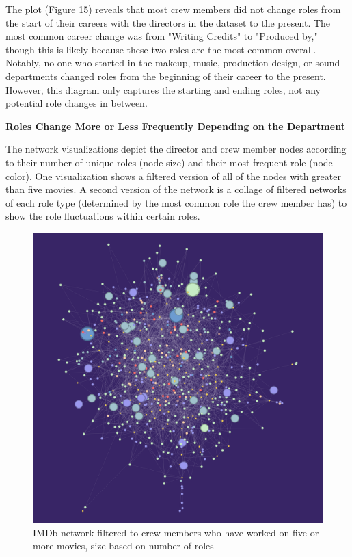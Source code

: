 \documentclass[12pt]{article}
\begin{document}
The plot (Figure 15) reveals that most crew members did not change roles from the start of their careers with the directors in the dataset to the present. The most common career change was from "Writing Credits" to "Produced by," though this is likely because these two roles are the most common overall. Notably, no one who started in the makeup, music, production design, or sound departments changed roles from the beginning of their career to the present. However, this diagram only captures the starting and ending roles, not any potential role changes in between.

\textbf{Roles Change More or Less Frequently Depending on the Department}

The network visualizations depict the director and crew member nodes according to their number of unique roles (node size) and their most frequent role (node color). One visualization shows a filtered version of all of the nodes with greater than five movies. A second version of the network is a collage of filtered networks of each role type (determined by the most common role the crew member has) to show the role fluctuations within certain roles.

\begin{figure}[H]
    \centering
    \includegraphics[clip,scale=0.12] {2_filterednetwork.png}
    \caption{IMDb network filtered to crew members who have worked on five or more movies, size based on number of roles}
    \label{fig:networkfiltered}
\end{figure}
\end{document}
